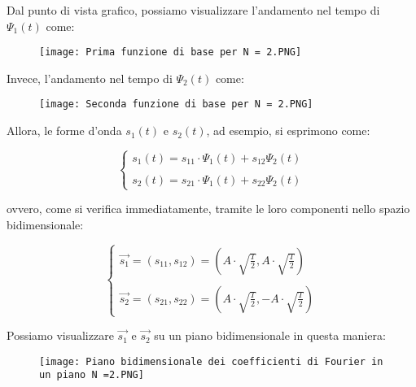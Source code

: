 \newpage 

Dal punto di vista grafico, 
possiamo visualizzare l'andamento nel tempo di $\Psi_1 (t)$ come: 

\begin{figure}[h]
    \centering
    \texttt{[image: Prima funzione di base per N = 2.PNG]}
\end{figure}

Invece, l'andamento nel tempo di $\Psi_2 (t)$ come: 

\begin{figure}[h]
    \centering
    \texttt{[image: Seconda funzione di base per N = 2.PNG]}
\end{figure}

Allora, le forme d'onda $s_1 (t)$ e $s_2 (t)$, ad esempio, si esprimono come: 

{
    \Large 
    \begin{equation}
        \begin{cases}
            s_1 (t) = s_{11} \cdot \Psi_1(t) + s_{12} \Psi_2 (t)
            \\
            \quad
            \\
            s_2 (t) = s_{21} \cdot \Psi_1(t) + s_{22} \Psi_2 (t)
        \end{cases}
    \end{equation}
}

ovvero, come si verifica immediatamente, tramite le loro componenti nello spazio bidimensionale: 

{
    \Large 
    \begin{equation}
        \begin{cases}
            \overrightarrow{s_1} = (s_{11}, s_{12} ) = \left(A \cdot \sqrt{\frac{T}{2}}, A \cdot \sqrt{\frac{T}{2}}\right)
            \\
            \quad
            \\
            \overrightarrow{s_2} = (s_{21}, s_{22} ) = \left(A \cdot \sqrt{\frac{T}{2}}, -A \cdot \sqrt{\frac{T}{2}}\right)
        \end{cases}
    \end{equation}
}

Possiamo visualizzare $\overrightarrow{s_1}$ e $\overrightarrow{s_2}$ su un piano bidimensionale in questa maniera: 

\begin{figure}[h]
    \centering
    \texttt{[image: Piano bidimensionale dei coefficienti di Fourier in un piano N =2.PNG]}
\end{figure}

